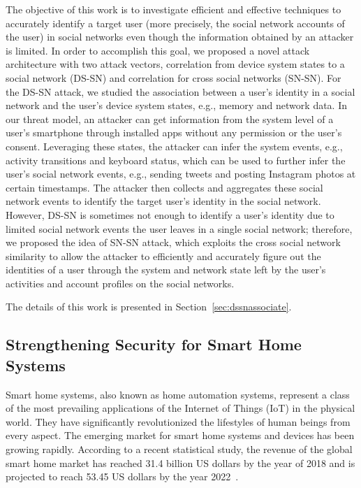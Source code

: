 \documentclass[letterpaper,12pt]{article}
\begin{document}
The objective of this work is to investigate efficient and effective techniques to accurately identify a target user (more precisely, the social network accounts of the user) in social networks even though the information obtained by an attacker is limited. 
In order to accomplish this goal, we proposed a novel attack architecture with two attack vectors, correlation from device system states to a social network (DS-SN) and correlation for cross social networks (SN-SN). For the DS-SN attack, we studied the association between a user's identity in a social network and the user's device system states, e.g., memory and network data. In our threat model, an attacker can get information from the system level of a user's smartphone through installed apps without any permission or the user's consent. Leveraging these states, the attacker can infer the system events, e.g., activity transitions and keyboard status, which can be used to further infer the user's social network events, e.g., sending tweets and posting Instagram photos at certain timestamps. The attacker then collects and aggregates these social network events to identify the target user's identity in the social network. However, DS-SN is sometimes not enough to identify a user's identity due to limited social network events the user leaves in a single social network; therefore, we proposed the idea of SN-SN attack, which exploits the cross social network similarity to allow the attacker to efficiently and accurately figure out the identities of a user through the system and network state left by the user's activities and account profiles on the social networks. 

The details of this work is presented in Section~\ref{sec:dssnassociate}. 

\subsection{Strengthening Security for Smart Home Systems}
Smart home systems, also known as home automation systems, represent a class of the most prevailing applications of the Internet of Things (IoT) in the physical world. They have significantly revolutionized the lifestyles of human beings from every aspect. The emerging market for smart home systems and devices has been growing rapidly. According to a recent statistical study, the revenue of the global smart home market has reached 31.4 billion US dollars by the year of 2018 and is projected to reach 53.45 US dollars by the year 2022~\cite{smarthomemarket}. 
\end{document}
